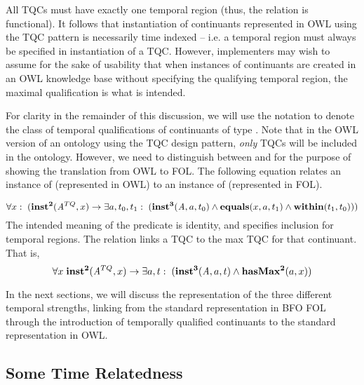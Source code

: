 All TQCs must have exactly one temporal region (thus, the  relation is functional). It follows that instantiation of continuants represented in OWL using the TQC pattern is necessarily time indexed -- i.e. a temporal region must always be specified in instantiation of a TQC. However, implementers may wish to assume for the sake of usability that when instances of continuants are created in an OWL knowledge base without specifying the qualifying temporal region, the maximal qualification is what is intended. 

For clarity in the remainder of this discussion, we will use the notation  to denote the class of temporal qualifications of
continuants of type . Note that in the OWL version of an ontology using the TQC design pattern, \emph{only} TQCs will be included in the ontology. However, we need to distinguish between  and  for the purpose of showing the translation from OWL to FOL. The following equation relates an instance of  (represented in OWL) to an instance of  (represented in FOL). 

\begin{equation}
\forall x:\; (\mathrm{\mathbf{inst^2}}(\mathit{A}^{TQ},x) \rightarrow \exists a,t_0,t_1:\;(
\mathrm{\mathbf{inst^3}}(\mathit{A},a,t_0) \wedge \mathrm{\mathbf{equals}}(x,a,t_1) \wedge
\mathrm{\mathbf{within}}(t_1,t_0)))
\end{equation}
The intended meaning of the predicate  is identity, and  specifies inclusion for temporal regions.  
The relation  links a TQC to the max TQC for that continuant. That is,
\begin{equation}
\forall x\; \mathrm{\mathbf{inst^2}}(\mathit{A}^{TQ},x) \rightarrow \exists a,t:\;(
\mathrm{\mathbf{inst^3}}(\mathit{A}, a,t) \wedge \mathrm{\mathbf{hasMax^2}}(a,x))
\end{equation}

In the next sections, we will discuss the representation of the three different
temporal strengths, linking from the standard representation in BFO FOL through
the introduction of temporally qualified continuants to the standard
representation in OWL.

\subsection*{Some Time Relatedness}

